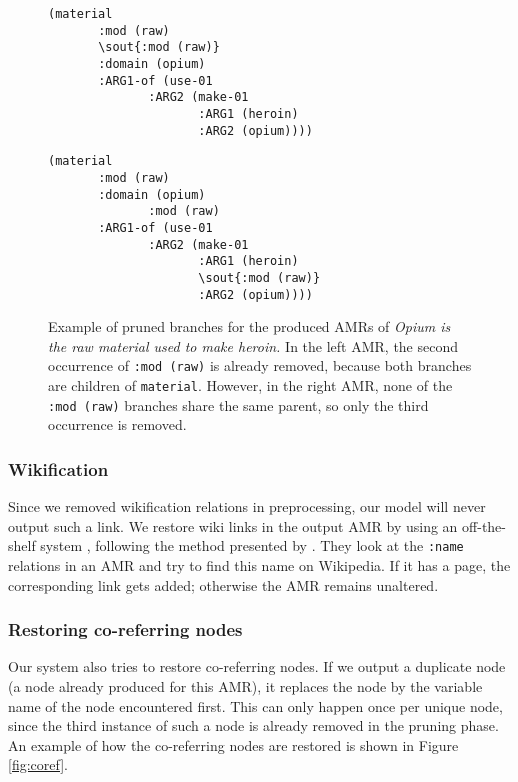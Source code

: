 \documentclass[a4paper,10pt,twoside]{article}
\begin{document}
\begin{figure*}[!htb]
{
  \begin{minipage}{.5\textwidth}\centering
  \begin{Verbatim}[commandchars=\\\{\}]
(material
       :mod (raw)
       \sout{:mod (raw)}
       :domain (opium)
       :ARG1-of (use-01
              :ARG2 (make-01
                     :ARG1 (heroin)
                     :ARG2 (opium))))
\end{Verbatim}
  \end{minipage}
  \begin{minipage}{0.5\textwidth}
  \begin{Verbatim}[commandchars=\\\{\}]
(material
       :mod (raw)
       :domain (opium)
              :mod (raw)
       :ARG1-of (use-01
              :ARG2 (make-01
                     :ARG1 (heroin)
                     \sout{:mod (raw)}
                     :ARG2 (opium))))
\end{Verbatim}
  \end{minipage}
  \caption{\label{fig:pruning}Example of pruned branches for the produced AMRs of \emph{Opium is the raw material used to make heroin.} In the left AMR, the second occurrence of \texttt{:mod (raw)} is already removed, because both branches are children of \texttt{material}. However, in the right AMR, none of the \texttt{:mod (raw)} branches share the same parent, so only the third occurrence is removed.}
}
\end{figure*}

\subsubsection{Wikification}

Since we removed wikification relations in preprocessing, our model will never output such a link. We restore wiki links in the output AMR by using an off-the-shelf system \cite{spotlight:2013}, following the method presented by . They look at the \texttt{:name} relations in an AMR and try to find this name on Wikipedia. If it has a page, the corresponding link gets added; otherwise the AMR remains unaltered. 

\subsubsection{Restoring co-referring nodes}

Our system also tries to restore co-referring nodes. If we output a duplicate node (a node already produced for this AMR), it replaces the node by the variable name of the node encountered first. This can only happen once per unique node, since the third instance of such a node is already removed in the pruning phase. An example of how the co-referring nodes are restored is shown in Figure \ref{fig:coref}.
\end{document}
